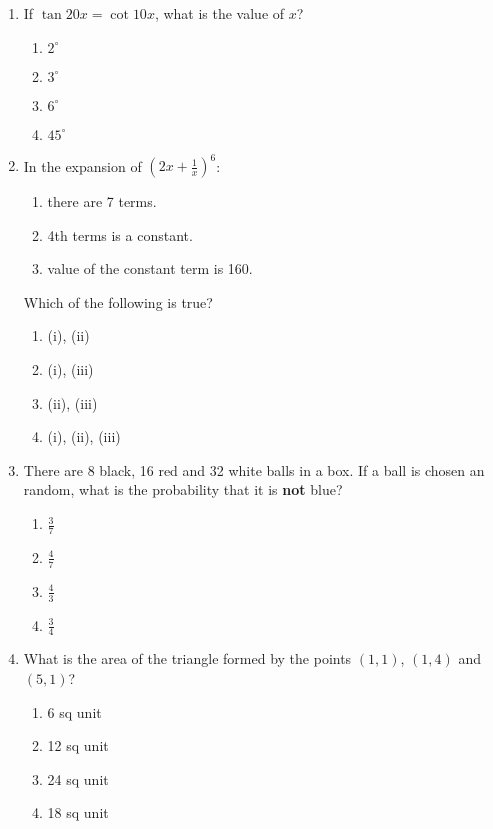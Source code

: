 \documentclass[12pt]{article}
\begin{document}
\begin{enumerate}
    \item If $\tan20x = \cot10x$, what is the value of $x$?
    \begin{enumerate}
        \item $2^\circ$
        \item $3^\circ$
        \item $6^\circ$
        \item $45^\circ$
    \end{enumerate}

    \item In the expansion of $(2x + \frac{1}{x})^6$:
    \begin{enumerate}[i]
        \item there are 7 terms.
        \item 4th terms is a constant.
        \item value of the constant term is 160.
    \end{enumerate}
    Which of the following is true?
    \begin{enumerate}
        \item (i), (ii)
        \item (i), (iii)
        \item (ii), (iii)
        \item (i), (ii), (iii)
    \end{enumerate}

    \item There are 8 black, 16 red and 32 white balls in a box. If a ball is chosen an random, what is the probability that it is \textbf{not} blue?
    \begin{enumerate}
        \item $\frac{3}{7}$
        \item $\frac{4}{7}$
        \item $\frac{4}{3}$
        \item $\frac{3}{4}$
    \end{enumerate}

    \item What is the area of the triangle formed by the points $(1, 1)$, $(1, 4)$ and $(5, 1)$?
    \begin{enumerate}
        \item 6 sq unit
        \item 12 sq unit
        \item 24 sq unit
        \item 18 sq unit
    \end{enumerate}


\end{enumerate}
\end{document}

